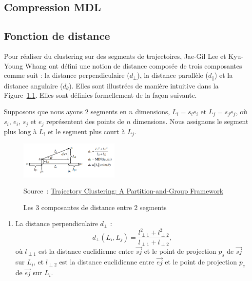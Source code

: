 \begin{appendix}
\chapter{Compression MDL}
\label{an:compression}

\section{Fonction de distance}
\label{an:compression_dist}

Pour réaliser du clustering sur des segments de trajectoires, Jae-Gil Lee et Kyu-Young Whang ont défini une notion de distance composée de trois composantes comme suit : la distance perpendiculaire ($d_{\perp}$), la distance parallèle ($d_{\parallel}$) et la distance angulaire ($d_{\theta}$). Elles sont illustrées de manière intuitive dans la Figure~\ref{fig:distancesA}. Elles sont définies formellement de la façon suivante. 

Supposons que nous ayons 2 segments en $n$ dimensions, $L_i = s_i e_i$ et $L_j = s_j e_j$, où $s_i$, $e_i$, $s_j$ et $e_j$ représentent des points de $n$ dimensions. Nous assignons le segment plus long à $L_i$ et le segment plus court à $L_j$.


\begin{figure}[ht]
    \centering
    \includegraphics[width=0.44\textwidth]{Images/distances.png}
    \caption{Les 3 composantes de distance entre 2 segments}
    \label{fig:distancesA}
    Source : \href{https://hanj.cs.illinois.edu/pdf/sigmod07_jglee.pdf}{Trajectory Clustering: A Partition-and-Group Framework}
\end{figure}

\begin{enumerate}
    \item La distance perpendiculaire $d_{\perp}$ :
        \begin{equation}
            d_{\perp}(L_i, L_j) = \frac{l_{\perp 1}^2 + l_{\perp 2}^2}{l_{\perp 1} + l_{\perp 2}},
        \end{equation}
        où $l_{\perp 1}$ est la distance euclidienne entre $\overrightarrow{sj}$ et le point de projection $p_s$ de $\overrightarrow{sj}$ sur $L_i$, et $l_{\perp 2}$ est la distance euclidienne entre $\overrightarrow{ej}$ et le point de projection $p_e$ de $\overrightarrow{ej}$ sur $L_i$.




\end{enumerate}
\end{appendix}
